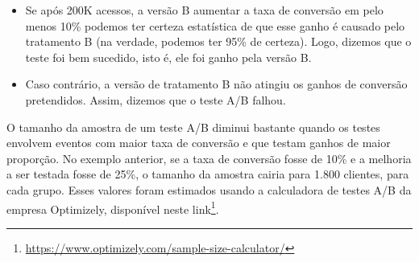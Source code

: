 \documentclass[
  11pt,
  twoside]{book}
\DeclareRobustCommand{\href}[2]{#2\footnote{\url{#1}}}
\begin{document}
\begin{itemize}
\item
  Se após 200K acessos, a versão B aumentar a taxa de conversão em pelo
  menos 10\% podemos ter certeza estatística de que esse ganho é causado
  pelo tratamento B (na verdade, podemos ter 95\% de certeza). Logo,
  dizemos que o teste foi bem sucedido, isto é, ele foi ganho pela
  versão B.
\item
  Caso contrário, a versão de tratamento B não atingiu os ganhos de
  conversão pretendidos. Assim, dizemos que o teste A/B falhou.
\end{itemize}

O tamanho da amostra de um teste A/B diminui bastante quando os testes
envolvem eventos com maior taxa de conversão e que testam ganhos de
maior proporção. No exemplo anterior, se a taxa de conversão fosse de
10\% e a melhoria a ser testada fosse de 25\%, o tamanho da amostra
cairia para 1.800 clientes, para cada grupo. Esses valores foram
estimados usando a calculadora de testes A/B da empresa Optimizely,
disponível neste
\href{https://www.optimizely.com/sample-size-calculator/}{link}.
\end{document}
